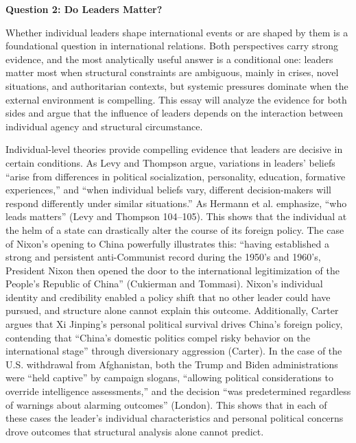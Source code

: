 \documentclass[12pt]{article}
\begin{document}
\newpage
\noindent \textbf{Question 2: Do Leaders Matter?}

Whether individual leaders shape international events or are shaped by them is a foundational question in international relations. Both perspectives carry strong evidence, and the most analytically useful answer is a conditional one: leaders matter most when structural constraints are ambiguous, mainly in crises, novel situations, and authoritarian contexts, but systemic pressures dominate when the external environment is compelling. This essay will analyze the evidence for both sides and argue that the influence of leaders depends on the interaction between individual agency and structural circumstance.

Individual-level theories provide compelling evidence that leaders are decisive in certain conditions. As Levy and Thompson argue, variations in leaders' beliefs ``arise from differences in political socialization, personality, education, formative experiences,'' and ``when individual beliefs vary, different decision-makers will respond differently under similar situations.'' As Hermann et al. emphasize, ``who leads matters'' (Levy and Thompson 104--105). This shows that the individual at the helm of a state can drastically alter the course of its foreign policy. The case of Nixon's opening to China powerfully illustrates this: ``having established a strong and persistent anti-Communist record during the 1950's and 1960's, President Nixon then opened the door to the international legitimization of the People's Republic of China'' (Cukierman and Tommasi). Nixon's individual identity and credibility enabled a policy shift that no other leader could have pursued, and structure alone cannot explain this outcome. Additionally, Carter argues that Xi Jinping's personal political survival drives China's foreign policy, contending that ``China's domestic politics compel risky behavior on the international stage'' through diversionary aggression (Carter). In the case of the U.S. withdrawal from Afghanistan, both the Trump and Biden administrations were ``held captive'' by campaign slogans, ``allowing political considerations to override intelligence assessments,'' and the decision ``was predetermined regardless of warnings about alarming outcomes'' (London). This shows that in each of these cases the leader's individual characteristics and personal political concerns drove outcomes that structural analysis alone cannot predict.
\end{document}
